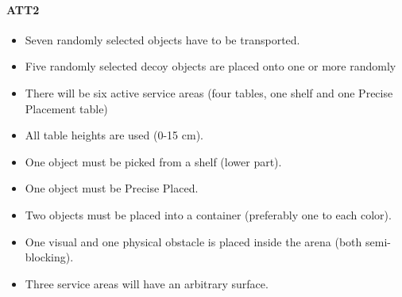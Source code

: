 \paragraph{ATT2}
\begin{itemize}
\item Seven randomly selected objects have to be transported.
\item Five randomly selected decoy objects are placed onto one or more randomly
\item There will be six active service areas (four tables,  one shelf and one Precise Placement table)
\item All table heights are used (0-15 $\si{\centi\meter}$).
\item One object must be picked from a shelf (lower part).
\item One object must be Precise Placed.
\item Two objects must be placed into a container (preferably one to each color).
\item One visual and one physical obstacle is placed inside the arena (both semi-blocking).
\item Three service areas will have an arbitrary surface.
\end{itemize}